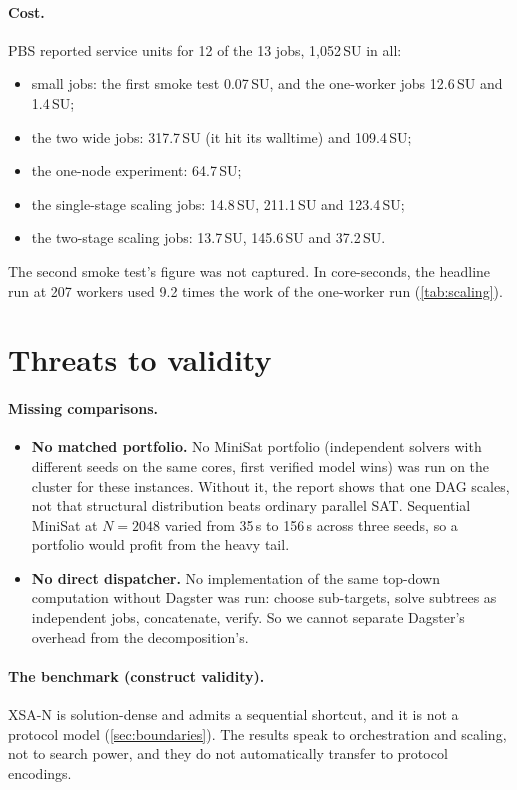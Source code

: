 \documentclass[11pt,a4paper]{article}
\newcommand{\XSA}{\textsf{XSA-N}}
\begin{document}
\paragraph{Cost.}
PBS reported service units for 12 of the 13 jobs, 1{,}052\,SU in all:
\begin{itemize}
\item small jobs: the first smoke test 0.07\,SU, and the one-worker jobs 12.6\,SU and
      1.4\,SU;
\item the two wide jobs: 317.7\,SU (it hit its walltime) and 109.4\,SU;
\item the one-node experiment: 64.7\,SU;
\item the single-stage scaling jobs: 14.8\,SU, 211.1\,SU and 123.4\,SU;
\item the two-stage scaling jobs: 13.7\,SU, 145.6\,SU and 37.2\,SU.
\end{itemize}
The second smoke test's figure was not captured. In core-seconds, the headline run at 207
workers used 9.2 times the work of the one-worker run (\cref{tab:scaling}).

\section{Threats to validity}
\label{sec:threats}
\paragraph{Missing comparisons.}
\begin{itemize}
\item \textbf{No matched portfolio.} No MiniSat portfolio (independent solvers with
      different seeds on the same cores, first verified model wins) was run on the cluster for these
      instances. Without it, the report shows that one DAG scales, not that structural
      distribution beats ordinary parallel SAT. Sequential MiniSat at $N=2048$ varied from
      35\,s to 156\,s across three seeds, so a portfolio would profit from the heavy tail.
\item \textbf{No direct dispatcher.} No implementation of the same top-down computation
      without Dagster was run: choose sub-targets, solve subtrees as independent jobs,
      concatenate, verify. So we cannot separate Dagster's overhead from the
      decomposition's.
\end{itemize}

\paragraph{The benchmark (construct validity).}
\XSA{} is solution-dense and admits a sequential shortcut, and it is not a protocol model
(\cref{sec:boundaries}). The results speak to orchestration and scaling, not to search
power, and they do not automatically transfer to protocol encodings.
\end{document}
